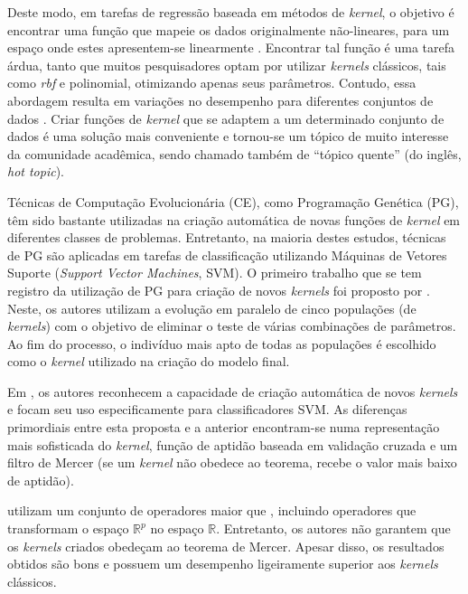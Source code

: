 \clearpage

Deste modo, em tarefas de regressão baseada em métodos de \textit{kernel}, o objetivo é encontrar uma função que mapeie os dados originalmente não-lineares, para um espaço onde estes apresentem-se linearmente \cite{smola1998}. Encontrar tal função é uma tarefa árdua, tanto que muitos pesquisadores optam por utilizar \textit{kernels} clássicos, tais como \textit{rbf} e polinomial, otimizando apenas seus parâmetros. Contudo, essa abordagem resulta em variações no desempenho para diferentes conjuntos de dados \cite{howley2005}. Criar funções de \textit{kernel} que se adaptem a um determinado conjunto de dados é uma solução mais conveniente e tornou-se um tópico de muito interesse da comunidade acadêmica, sendo chamado também de ``tópico quente'' (do inglês, \textit{hot topic}).

Técnicas de Computação Evolucionária (CE), como Programação Genética (PG), têm sido bastante utilizadas na criação automática de novas funções de \textit{kernel} em diferentes classes de problemas. Entretanto, na maioria destes estudos, técnicas de PG são aplicadas em tarefas de classificação utilizando Máquinas de Vetores Suporte (\textit{Support Vector Machines}, SVM). O primeiro trabalho que se tem registro da utilização de PG para criação de novos \textit{kernels} foi proposto por . Neste, os autores utilizam a evolução em paralelo de cinco populações (de \textit{kernels}) com o objetivo de eliminar o teste de várias combinações de parâmetros. Ao fim do processo, o indivíduo mais apto de todas as populações é escolhido como o \textit{kernel} utilizado na criação do modelo final.

Em \cite{howley2006}, os autores reconhecem a capacidade de criação automática de novos \textit{kernels} e focam seu uso especificamente para classificadores SVM. As diferenças primordiais entre esta proposta e a anterior encontram-se numa representação mais sofisticada do \textit{kernel}, função de aptidão baseada em validação cruzada e um filtro de Mercer (se um \textit{kernel} não obedece ao teorema, recebe o valor mais baixo de aptidão).

 utilizam um conjunto de operadores maior que \cite{howley2006}, incluindo operadores que transformam o espaço $\mathbb{R}^p$ no espaço $\mathbb{R}$. Entretanto, os autores não garantem que os \textit{kernels} criados obedeçam ao teorema de Mercer. Apesar disso, os resultados obtidos são bons e possuem um desempenho ligeiramente superior aos \textit{kernels} clássicos.

